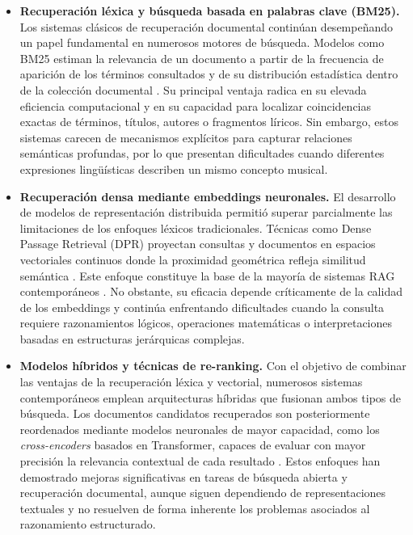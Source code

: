 \begin{itemize}
    \item \textbf{Recuperación léxica y búsqueda basada en palabras clave (BM25).} Los sistemas clásicos de recuperación documental continúan desempeñando un papel fundamental en numerosos motores de búsqueda. Modelos como BM25 estiman la relevancia de un documento a partir de la frecuencia de aparición de los términos consultados y de su distribución estadística dentro de la colección documental \citep{robertson2009probabilistic}. Su principal ventaja radica en su elevada eficiencia computacional y en su capacidad para localizar coincidencias exactas de términos, títulos, autores o fragmentos líricos. Sin embargo, estos sistemas carecen de mecanismos explícitos para capturar relaciones semánticas profundas, por lo que presentan dificultades cuando diferentes expresiones lingüísticas describen un mismo concepto musical.
    \item \textbf{Recuperación densa mediante embeddings neuronales.} El desarrollo de modelos de representación distribuida permitió superar parcialmente las limitaciones de los enfoques léxicos tradicionales. Técnicas como Dense Passage Retrieval (DPR) proyectan consultas y documentos en espacios vectoriales continuos donde la proximidad geométrica refleja similitud semántica \citep{karpukhin2020dense}. Este enfoque constituye la base de la mayoría de sistemas RAG contemporáneos \citep{lewis2020retrieval}. No obstante, su eficacia depende críticamente de la calidad de los embeddings y continúa enfrentando dificultades cuando la consulta requiere razonamientos lógicos, operaciones matemáticas o interpretaciones basadas en estructuras jerárquicas complejas.
    \item \textbf{Modelos híbridos y técnicas de re-ranking.} Con el objetivo de combinar las ventajas de la recuperación léxica y vectorial, numerosos sistemas contemporáneos emplean arquitecturas híbridas que fusionan ambos tipos de búsqueda. Los documentos candidatos recuperados son posteriormente reordenados mediante modelos neuronales de mayor capacidad, como los \textit{cross-encoders} basados en Transformer, capaces de evaluar con mayor precisión la relevancia contextual de cada resultado \citep{nogueira2019passage, thakur2021beir}. Estos enfoques han demostrado mejoras significativas en tareas de búsqueda abierta y recuperación documental, aunque siguen dependiendo de representaciones textuales y no resuelven de forma inherente los problemas asociados al razonamiento estructurado.

\end{itemize}
